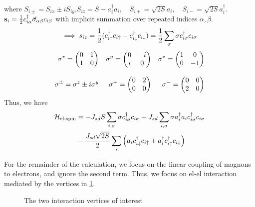 where $S_{i\pm} = S_{ix}\pm iS_{iy}$,\quad \(S_{iz} = S-a_i^\dagger a_i, \quad S_{i+} = \sqrt{2S}a_i, \quad S_{i-} = \sqrt{2S}a_i^\dagger\). $\vb s_i =\frac12c_{i\alpha}^\dagger \vec\sigma_{\alpha\beta}c_{i\beta}$ with implicit summation over repeated indices $\alpha, \beta$. \[\implies s_{iz} = \frac12(c^{\dagger}_{i\uparrow}c_{i\uparrow} - c^{\dagger}_{i\downarrow}c_{i\downarrow}) = \frac12\sum_\sigma\sigma c^{\dagger}_{i\sigma}c_{i\sigma}\]
\begin{align*}
\sigma^x = \mqty(\pmat1) &&\sigma^y = \mqty(\pmat2) &&\sigma^z= \mqty(\pmat3) \\[2ex]
\sigma^\pm = \sigma^z \pm i\sigma^y &&\sigma^+ = \begin{pmatrix}
0 & 2 \\ 0&0
\end{pmatrix}
&&\sigma^- = \begin{pmatrix}
0&0\\2&0
\end{pmatrix}
\end{align*}
Thus, we have
\begin{align}
\begin{split}
	\mathcal{H}_\text{el-spin} &= -J_{sd}S\sum_{i,\sigma}\sigma c^{\dagger}_{i\sigma}c_{i\sigma}+J_{sd}\sum_{i,\sigma}\sigma a_i^\dagger a_i c^{\dagger}_{i\sigma}c_{i\sigma} \\ 
	&-\frac{J_{sd}\sqrt{2S}}{2}\sum_i\left(a_ic^{\dagger}_{i\downarrow}c_{i\uparrow} + a^{\dagger}_i c^{\dagger}_{i\uparrow}c_{i\downarrow}\right)
\end{split}
\end{align}

For the remainder of the calculation, we focus on the linear coupling of magnons to electrons, and ignore the second term. Thus, we focus on el-el interaction mediated by the vertices in \cref{fig:el-magnon-vertices}.

\begin{figure}
	\centering
	\begin{subfigure}{0.49\linewidth}
		\centering
		
	\end{subfigure}
	\begin{subfigure}{0.49\linewidth}
		\centering
		
	\end{subfigure}
	\caption{The two interaction vertices of interest}
	\label{fig:el-magnon-vertices}
\end{figure}

